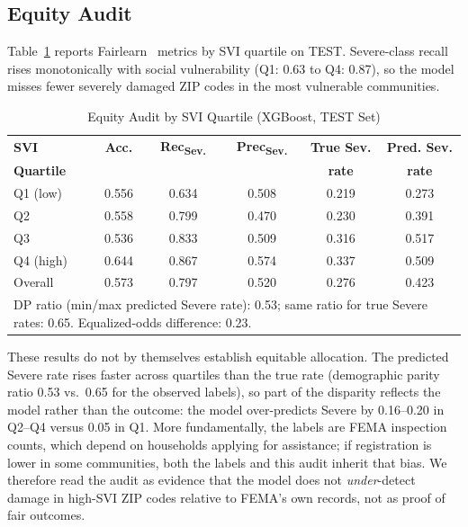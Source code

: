 \documentclass[conference]{IEEEtran}
\renewcommand{\_}{\origunderscore\allowbreak}
\begin{document}
\subsection{Equity Audit}

Table~\ref{tab:equity} reports Fairlearn~\cite{bird_fairlearn}
metrics by SVI quartile on TEST. Severe-class recall rises
monotonically with social vulnerability (Q1: 0.63 to Q4: 0.87),
so the model misses fewer severely damaged ZIP codes in the most
vulnerable communities.

\begin{table}[htbp]
\caption{Equity Audit by SVI Quartile (XGBoost, TEST Set)}
\label{tab:equity}
\centering
\small
\setlength{\tabcolsep}{3.5pt}
\begin{tabular}{lccccc}
\toprule
\textbf{SVI} & \textbf{Acc.} & \textbf{Rec\textsubscript{Sev.}} &
\textbf{Prec\textsubscript{Sev.}} & \textbf{True Sev.} &
\textbf{Pred. Sev.} \\
\textbf{Quartile} & & & & \textbf{rate} & \textbf{rate} \\
\midrule
Q1 (low)  & 0.556 & 0.634 & 0.508 & 0.219 & 0.273 \\
Q2        & 0.558 & 0.799 & 0.470 & 0.230 & 0.391 \\
Q3        & 0.536 & 0.833 & 0.509 & 0.316 & 0.517 \\
Q4 (high) & 0.644 & 0.867 & 0.574 & 0.337 & 0.509 \\
\midrule
Overall   & 0.573 & 0.797 & 0.520 & 0.276 & 0.423 \\
\bottomrule
\multicolumn{6}{p{0.94\columnwidth}}{\footnotesize DP ratio
(min/max predicted Severe rate): 0.53; same ratio for true
Severe rates: 0.65. Equalized-odds difference: 0.23.}\\
\end{tabular}
\end{table}

These results do not by themselves establish equitable
allocation. The predicted Severe rate rises faster across
quartiles than the true rate (demographic parity ratio 0.53 vs.\
0.65 for the observed labels), so part of the disparity reflects
the model rather than the outcome: the model over-predicts Severe
by 0.16--0.20 in Q2--Q4 versus 0.05 in Q1. More fundamentally, the labels
are FEMA inspection counts, which depend on households applying
for assistance; if registration is lower in some communities,
both the labels and this audit inherit that bias. We therefore
read the audit as evidence that the model does not
\textit{under}-detect damage in high-SVI ZIP codes relative to
FEMA's own records, not as proof of fair outcomes.
\end{document}
